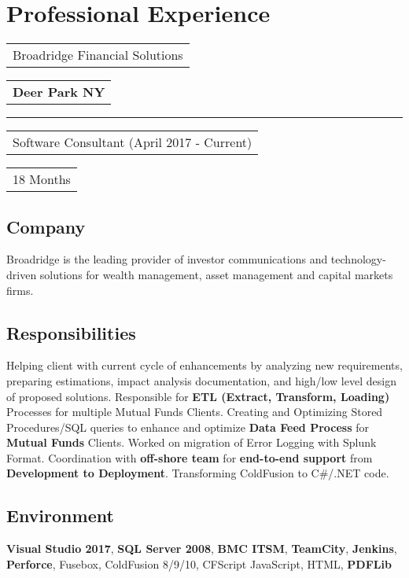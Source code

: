 \documentclass[letterpaper,10pt]{article}
\begin{document}
    \newpage
    \section{Professional Experience}


    \noindent
    \begin{tabular}[t]{@{}l}
    \Large{Broadridge Financial Solutions}
    \end{tabular}
    \hfill
    \begin{tabular}[t]{l@{}}
    \textbf{Deer Park NY}
    \end{tabular}
    \noindent\rule{\textwidth}{0.5pt}
    \begin{tabular}[t]{@{}l}
    Software Consultant (April 2017 - Current)
    \end{tabular}
    \hfill
    \begin{tabular}[t]{l@{}}
    18 Months
    \end{tabular}

    \subsection{Company}
    Broadridge is the leading provider of investor communications and technology-driven solutions for wealth management, asset management and capital markets firms.

    \subsection{Responsibilities}
    Helping client with current cycle of enhancements by analyzing new requirements, preparing estimations, impact analysis documentation, and high/low level design of proposed solutions. Responsible for \textbf{ETL (Extract, Transform, Loading)} Processes for multiple Mutual Funds Clients. Creating and Optimizing Stored Procedures/SQL queries to enhance and optimize \textbf{Data Feed Process} for \textbf{Mutual Funds} Clients. Worked on migration of Error Logging with Splunk Format. Coordination with \textbf{off-shore team} for \textbf{end-to-end support} from \textbf{Development to Deployment}. Transforming ColdFusion to C\#/.NET code.

    \subsection{Environment}
    \textbf{Visual Studio 2017}, \textbf{SQL Server 2008}, \textbf{BMC ITSM}, \textbf{TeamCity}, \textbf{Jenkins}, \textbf{Perforce}, Fusebox,  ColdFusion 8/9/10, CFScript JavaScript, HTML, \textbf{PDFLib}
\end{document}
